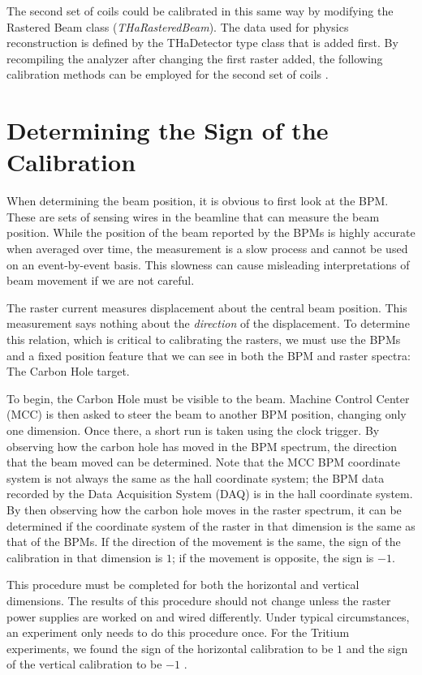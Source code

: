 The second set of coils could be calibrated in this same way by modifying the Rastered Beam class (\textit{THaRasteredBeam}). The data used for physics reconstruction is defined by the THaDetector type class that is added first. By recompiling the analyzer after changing the first raster added, the following calibration methods can be employed for the second set of coils \cite{Gen}.

\section{Determining the Sign of the Calibration}

When determining the beam position, it is obvious to first look at the BPM. These are sets of sensing wires in the beamline that can measure the beam position. While the position of the beam reported by the BPMs is highly accurate when averaged over time, the measurement is a slow process and cannot be used on an event-by-event basis. This slowness can cause misleading interpretations of beam movement if we are not careful.

The raster current measures displacement about the central beam position. This measurement says nothing about the \textit{direction} of the displacement. To determine this relation, which is critical to calibrating the rasters, we must use the BPMs and a fixed position feature that we can see in both the BPM and raster spectra: The Carbon Hole target.

To begin, the Carbon Hole must be visible to the beam. Machine Control Center (MCC) is then asked to steer the beam to another BPM position, changing only one dimension. Once there, a short run is taken using the clock trigger. By observing how the carbon hole has moved in the BPM spectrum, the direction that the beam moved can be determined. Note that the MCC BPM coordinate system is not always the same as the hall coordinate system; the BPM data recorded by the Data Acquisition System (DAQ) is in the hall coordinate system. By then observing how the carbon hole moves in the raster spectrum, it can be determined if the coordinate system of the raster in that dimension is the same as that of the BPMs. If the direction of the movement is the same, the sign of the calibration in that dimension is $1$; if the movement is opposite, the sign is $-1$.

This procedure must be completed for both the horizontal and vertical dimensions. The results of this procedure should not change unless the raster power supplies are worked on and wired differently. Under typical circumstances, an experiment only needs to do this procedure once. For the Tritium experiments, we found the sign of the horizontal calibration to be $1$ and the sign of the vertical calibration to be $-1$ \cite{Dien}.

